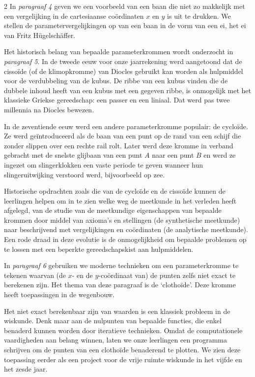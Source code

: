 \begin{multicols}{2}
	In \emph{paragraaf 4} geven we een voorbeeld van een baan die niet zo makkelijk met een vergelijking in de cartesiaanse coördinaten $x$ en $y$ is uit te drukken. We stellen de parametervergelijkingen op van een baan in de vorm van een ei, het ei van Fritz Hügelschäffer.
	
	Het historisch belang van bepaalde parameterkrommen wordt onderzocht in \emph{paragraaf 5}. In de tweede eeuw voor onze jaarrekening werd aangetoond dat de cissoïde (of de klimopkromme) van Diocles gebruikt kan worden als hulpmiddel voor de verdubbeling van de kubus. De ribbe  van een kubus vinden die de dubbele inhoud heeft van een kubus met een gegeven ribbe, is onmogelijk met het klassieke Griekse gereedschap: een passer en een liniaal. Dat werd pas twee millennia na Diocles bewezen.
	
	In de zeventiende eeuw werd een andere parameterkromme populair: de cycloïde. Ze werd geïntroduceerd als de baan van een punt op de rand van een schijf die zonder slippen over een rechte rail rolt. Later werd deze kromme in verband gebracht met de snelste glijbaan van een punt $A$ naar een punt $B$ en werd ze ingezet om slingerklokken een vaste periode te geven wanneer hun slingeruitwijking verstoord werd, bijvoorbeeld op zee. 
	
	Historische opdrachten zoals die van de cycloïde en de cissoïde kunnen de leerlingen helpen om in te zien welke weg de meetkunde in het verleden heeft afgelegd, van de studie van de meetkundige eigenschappen van bepaalde krommen door middel van axioma's en stellingen (de synthetische meetkunde) naar beschrijvend met vergelijkingen en coördinaten (de analytische meetkunde). Een rode draad in deze evolutie is de onmogelijkheid om bepaalde problemen op te lossen met een beperkte gereedschapskist aan hulpmiddelen. 
	
    In \emph{paragraaf 6} gebruiken we moderne technieken om een parameterkromme te tekenen waarvan (de $x$- en de $y$-coördinaat van) de punten zelfs niet exact te berekenen zijn. Het thema van deze paragraaf is de `clothoïde'. Deze kromme heeft toepassingen in de wegenbouw. 
    
    Het niet exact berekenbaar zijn van waarden is een klassiek probleem in de wiskunde. Denk maar aan de nulpunten van bepaalde functies, die enkel benaderd kunnen worden door iteratieve technieken. Omdat de computationele vaardigheden aan belang winnen, laten we onze leerlingen een programma schrijven om de punten van een clothoïde benaderend te plotten. We zien deze toepassing eerder als een project voor de vrije ruimte wiskunde in het vijfde en het zesde jaar.
	

\end{multicols}
